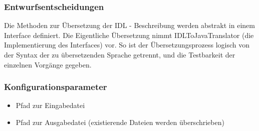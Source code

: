 \documentclass{article}
\begin{document}
\subsubsection{Entwurfsentscheidungen}
Die Methoden zur Übersetzung der IDL - Beschreibung werden abstrakt in einem Interface 
definiert. Die Eigentliche Übersetzung nimmt IDLToJavaTranslator (die Implementierung des 
Interfaces) vor. So ist der Übersetzungsprozess logisch von der Syntax der zu übersetzenden
Sprache getrennt, und die Testbarkeit der einzelnen Vorgänge gegeben.
\subsubsection{Konfigurationsparameter}

\begin{itemize}
    \item Pfad zur Eingabedatei
    \item Pfad zur Ausgabedatei (existierende Dateien werden überschrieben)    
\end{itemize}
\end{document}
